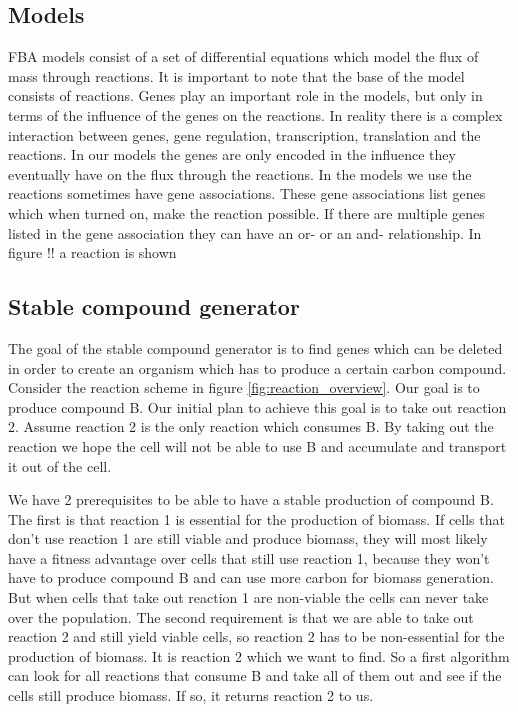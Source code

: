 \documentclass[10pt]{report}
\begin{document}
\subsection{Models}\label{sec:intro_models}
FBA models consist of a set of differential equations which model the flux of mass through reactions. It is important to note that the base of the model consists of reactions. Genes play an important role in the models, but only in terms of the influence of the genes on the reactions. In reality there is a complex interaction between genes, gene regulation, transcription, translation and the reactions. In our models the genes are only encoded in the influence they eventually have on the flux through the reactions. In the models we use the reactions sometimes have gene associations. These gene associations list genes which when turned on, make the reaction possible. If there are multiple genes listed in the gene association they can have an or- or an and- relationship. In figure !! a reaction is shown 

\subsection{Stable compound generator}
The goal of the stable compound generator is to find genes which can be deleted in order to create an organism which has to produce a certain carbon compound. Consider the reaction scheme in figure \ref{fig:reaction_overview}. Our goal is to produce compound B. Our initial plan to achieve this goal is to take out reaction 2. Assume reaction 2 is the only reaction which consumes B. By taking out the reaction we hope the cell will not be able to use B and accumulate and transport it out of the cell.

We have 2 prerequisites to be able to have a stable production of compound B. The first is that reaction 1 is essential for the production of biomass. If cells that don't use reaction 1 are still viable and produce biomass, they will most likely have a fitness advantage over cells that still use reaction 1, because they won't have to produce compound B and can use more carbon for biomass generation. But when cells that take out reaction 1 are non-viable the cells can never take over the population.
The second requirement is that we are able to take out reaction 2 and still yield viable cells, so reaction 2 has to be non-essential for the production of biomass. It is reaction 2 which we want to find. So a first algorithm can look for all reactions that consume B and take all of them out and see if the cells still produce biomass. If so, it returns reaction 2 to us.
\end{document}
